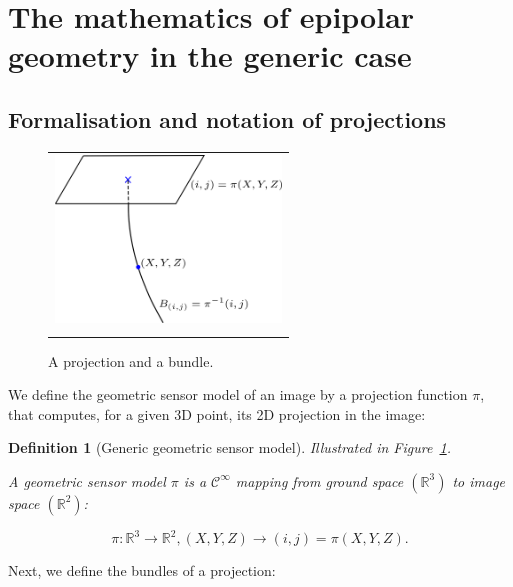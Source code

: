 \documentclass{ipol}
\newcommand{\RR}{\ensuremath{\mathbb{R}}}
\newtheorem{definition}{Definition}
\begin{document}
\section{The mathematics of epipolar geometry in the generic case}\label{sec:math}

\subsection{Formalisation and notation of projections}

\begin{figure}[htb]
\centering
\begin{tabular}{c}
 \\
\includegraphics[width=6cm]{FIGS/NotaProj.png} 
 \\ 
  \\%
\end{tabular}
\caption{A projection and a bundle.}
\label{FigNotaProj}
\end{figure}




We define the geometric sensor model of an image by a projection function $\pi$, that computes, for a given 3D
point, its 2D projection in the image:

\begin{definition}[Generic geometric sensor model]  

\emph{Illustrated in Figure~\ref{FigNotaProj}.}

A geometric sensor model $\pi$ is a $\mathcal{C}^{\infty}$ mapping from ground space $(\RR^3)$ to image space $(\RR^2)$:

\begin{equation}
  \pi :  \RR^3  \rightarrow \RR^2  ,  (X,Y,Z)  \rightarrow (i,j) = \pi(X,Y,Z). \label{Eq:Proj}
\end{equation}
\end{definition}

\noindent Next, we define the bundles of a projection:
\end{document}
